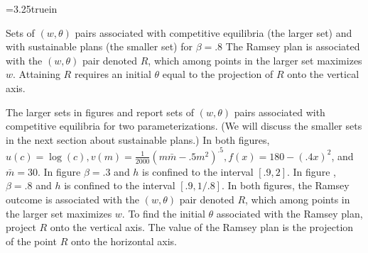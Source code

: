 \centerline{\epsfxsize=3.25truein}
\caption{Sets of $(w, \theta)$ pairs  associated with competitive equilibria (the larger set) and with sustainable plans (the smaller set) for $\beta = .8$   The Ramsey plan is associated with the $(w, \theta)$ pair
 denoted  $R$,  which among points in the larger set maximizes $w$. Attaining $R$ requires an initial $\theta$ equal to the projection of $R$ onto the vertical axis.}
\endfigure


The larger sets in
figures   and  report sets of $(w,\theta)$ pairs associated with competitive equilibria for two parameterizations.
(We will discuss the smaller sets in the next section about sustainable plans.)
In both figures, $ u(c) = \log (c),   v(m) = {\frac{1}{2000} }(m \bar m - .5m^2)^{.5}, f(x) =180 - (.4x)^2$, and $\bar m = 30$. In figure  $\beta = .3$ and $h$ is confined to the interval $[.9, 2]$.  In figure , $\beta = .8$ and $h$ is confined to the interval
$[.9, 1/.8]$.    In both figures, the Ramsey outcome is associated   with the $(w,\theta)$ pair
denoted $R$, which among points in the larger set maximizes $w$. To find the  initial $\theta$ associated with the Ramsey plan, project $R$ onto the vertical axis. The value of the Ramsey plan is the projection of the point $R$ onto the horizontal axis.
%
%


%





